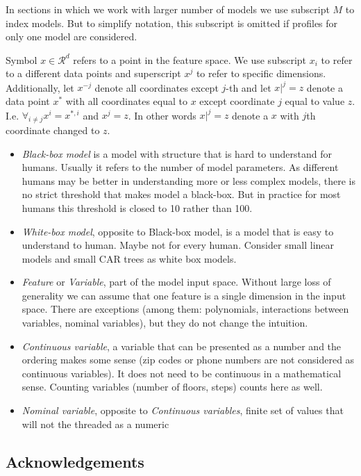 \documentclass[]{krantz}
\providecommand{\tightlist}{%
  \setlength{\itemsep}{0pt}\setlength{\parskip}{0pt}}
\theoremstyle{definition}
\theoremstyle{definition}
\theoremstyle{definition}
\theoremstyle{remark}
\begin{document}
In sections in which we work with larger number of models we use
subscript \(M\) to index models. But to simplify notation, this
subscript is omitted if profiles for only one model are considered.

Symbol \(x \in \mathcal R^d\) refers to a point in the feature space. We
use subscript \(x_i\) to refer to a different data points and
superscript \(x^j\) to refer to specific dimensions. Additionally, let
\(x^{-j}\) denote all coordinates except \(j\)-th and let \(x|^j=z\)
denote a data point \(x^*\) with all coordinates equal to \(x\) except
coordinate \(j\) equal to value \(z\). I.e.
\(\forall_{i \neq {j}} x^i = x^{*,i}\) and \(x^j = z\). In other words
\(x|^j=z\) denote a \(x\) with \(j\)th coordinate changed to \(z\).

\begin{itemize}
\tightlist
\item
  \emph{Black-box model} is a model with structure that is hard to
  understand for humans. Usually it refers to the number of model
  parameters. As different humans may be better in understanding more or
  less complex models, there is no strict threshold that makes model a
  black-box. But in practice for most humans this threshold is closed to
  10 rather than 100.
\item
  \emph{White-box model}, opposite to Black-box model, is a model that
  is easy to understand to human. Maybe not for every human. Consider
  small linear models and small CAR trees as white box models.
\item
  \emph{Feature} or \emph{Variable}, part of the model input space.
  Without large loss of generality we can assume that one feature is a
  single dimension in the input space. There are exceptions (among them:
  polynomials, interactions between variables, nominal variables), but
  they do not change the intuition.
\item
  \emph{Continuous variable}, a variable that can be presented as a
  number and the ordering makes some sense (zip codes or phone numbers
  are not considered as continuous variables). It does not need to be
  continuous in a mathematical sense. Counting variables (number of
  floors, steps) counts here as well.
\item
  \emph{Nominal variable}, opposite to \emph{Continuous variables},
  finite set of values that will not the threaded as a numeric
\end{itemize}

\hypertarget{thanksto}{%
\subsection{Acknowledgements}\label{thanksto}}
\end{document}
